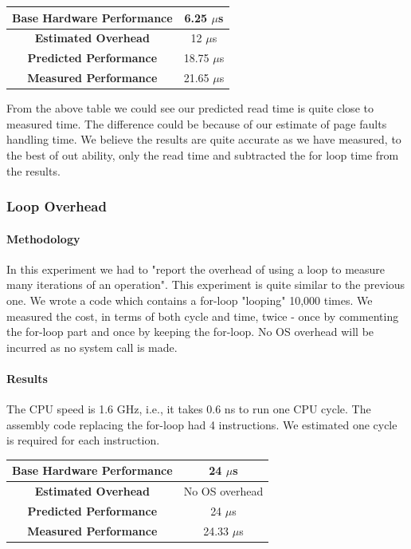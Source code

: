 \documentclass[conference]{IEEEtran}
\begin{document}
\begin{center}
\begin{tabular}{ |c|c| } 
  \hline
  \textbf{Base Hardware Performance} & 6.25 $\mu$s \\ 
  \hline
  \textbf{Estimated Overhead} &  12 $\mu$s \\ 
  \hline
  \textbf{Predicted Performance} & 18.75 $\mu$s \\ 
  \hline
  \textbf{Measured Performance} & 21.65 $\mu$s \\ 
  \hline
\end{tabular}
\end{center}

From the above table we could see our predicted read time is quite close to measured time. The difference could be because of our estimate of page faults handling time.
We believe the results are quite accurate as we have measured, to the best of out ability, only the read time and subtracted the for loop time from the results.


\subsubsection{Loop Overhead}

\paragraph{Methodology}

In this experiment we had to "report the overhead of using a loop to measure many iterations of an operation".
This experiment is quite similar to the previous one. We wrote a code which contains a for-loop "looping" 10,000 times. We measured the cost, in terms of both cycle and time, twice - once by commenting the for-loop part and once by keeping the for-loop. No OS overhead will be incurred as no system call is made.

\paragraph{Results}

The CPU speed is 1.6 GHz, i.e., it takes 0.6 ns to run one CPU cycle. The assembly code replacing the for-loop had 4 instructions. We estimated one cycle is required for each instruction.

\begin{center}
\begin{tabular}{ |c|c| } 
  \hline
  \textbf{Base Hardware Performance} & 24 $\mu$s \\ 
  \hline
  \textbf{Estimated Overhead} &  No OS overhead \\ 
  \hline
  \textbf{Predicted Performance} & 24 $\mu$s \\ 
  \hline
  \textbf{Measured Performance} & 24.33 $\mu$s \\ 
  \hline
\end{tabular}
\end{center}
\end{document}
